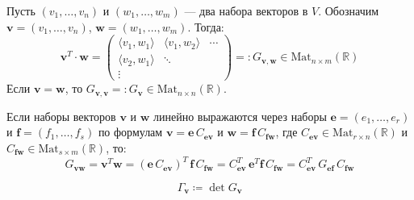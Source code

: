 \begin{definition}
    Пусть $(v_1, \dots, v_n)$ и $(w_1, \dots, w_m)$ --- два набора векторов в $V$.
    Обозначим $\mathbf{v} = (v_1, \dots, v_n)$, $\mathbf{w} = (w_1, \dots, w_m)$. Тогда:
    \[
        \mathbf{v}^T \cdot \mathbf{w} =
        \begin{pmatrix}
            \langle v_1, w_1 \rangle & \langle v_1, w_2 \rangle & \cdots \\
            \langle v_2, w_1 \rangle & \ddots & \\
            \vdots & &
        \end{pmatrix}
        =: G_{\mathbf{v}, \mathbf{w}} \in \mathrm{Mat}_{n \times m}(\mathbb{R})
    \]
    Если $\mathbf{v} = \mathbf{w}$, то $G_{\mathbf{v}, \mathbf{v}} =: G_{\mathbf{v}} \in \mathrm{Mat}_{n \times n}(\mathbb{R})$.
\end{definition}

\newpage

\begin{stmt}
    Если наборы векторов $\mathbf{v}$ и $\mathbf{w}$ линейно выражаются через наборы
    $\mathbf{e} = (e_1, \dots, e_r)$ и $\mathbf{f} = (f_1, \dots, f_s)$
    по формулам $\mathbf{v} = \mathbf{e}\, C_{\mathbf{e}\mathbf{v}}$ и $\mathbf{w} = \mathbf{f}\, C_{\mathbf{f}\mathbf{w}}$,
    где $C_{\mathbf{e}\mathbf{v}} \in \mathrm{Mat}_{r \times n}(\mathbb{R})$ и $C_{\mathbf{f}\mathbf{w}} \in \mathrm{Mat}_{s \times m}(\mathbb{R})$, то:
    \[
        G_{\mathbf{v}\mathbf{w}}
        = \mathbf{v}^T \mathbf{w}
        = (\mathbf{e}\, C_{\mathbf{e}\mathbf{v}})^T\, \mathbf{f}\, C_{\mathbf{f}\mathbf{w}}
        = C_{\mathbf{e}\mathbf{v}}^T\, \mathbf{e}^T \mathbf{f}\, C_{\mathbf{f}\mathbf{w}}
        = C_{\mathbf{e}\mathbf{v}}^T\, G_{\mathbf{e}\mathbf{f}}\, C_{\mathbf{f}\mathbf{w}}
    \]
\end{stmt}


\begin{definition} 
    \[
    \Gamma_{\mathbf{v}} \coloneqq \det G_{\mathbf{v}}
    \]
\end{definition}

